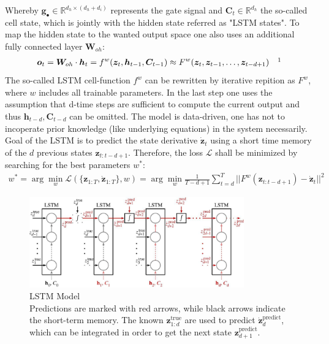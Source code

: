 	Whereby $\bm{g}_\bullet\in\mathbb{R}^{d_h\times(d_h+d_i)}$ represents the gate signal and $\bm{C}_t\in\mathbb{R}^{d_h}$ the so-called cell state, which is jointly with the hidden state referred as "LSTM states". To map the hidden state to the wanted output space one also uses an additional fully connected layer $\bm{W}_{oh}$:
	\begin{align}
		\bm{o}_t = \bm{W}_{oh}\cdot\bm{h}_t = f^w(\bm{z}_t, \bm{h}_{t-1}, \bm{C}_{t-1}) \approx F^w(\bm{z}_t, \bm{z}_{t-1}, \hdots, \bm{z}_{t-d+1}) \quad\footnotemark
	\end{align}
	The so-called LSTM cell-function $f^w$ can be rewritten by iterative repition as $F^w$, where $w$ includes all trainable parameters. In the last step one uses the assumption that d-time steps are sufficient to compute the current output and thus $\bm{h}_{t-d},\bm{C}_{t-d}$ can be omitted. The model is data-driven, one has not to incoperate prior knowledge (like underlying equations) in the system necessarily.
	Goal of the LSTM is to predict the state derivative $\bm{\dot{z}}_t$ using a short time memory of the $d$ previous states $\bm{z}_{t:t-d+1}$. Therefore, the loss $\mathcal{L}$ shall be minimized by searching for the best parameters $w^*$:
	\begin{align}
	w^* = \arg\min_w\mathcal{L}(\{\bm{z}_{1:T},\bm{\dot{z}}_{1:T}\},w)=\arg\min_w\frac{1}{T-d+1}\sum_{t=d}^T||F^w(\bm{z}_{t:t-d+1})-\bm{\dot{z}}_t||^2
	\end{align}
	\begin{figure}
		\includegraphics[width=9.25cm]{images/LSTM_Vlachas.jpg}
		\captionsetup{format=plain}
		\caption{LSTM Model\cite{Vlachas}\\Predictions are marked with red arrows, while black arrows indicate the short-term memory. The known $\bm{z}_{1:d}^{\text{true}}$ are used to predict $\bm{\dot{z}}_d^{\text{predict}}$, which can be integrated in order to get the next state $\bm{z}_{d+1}^{\text{predict}}$.}
	\end{figure}

